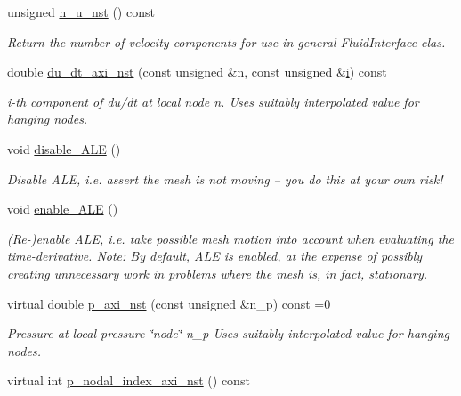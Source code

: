 \begin{DoxyCompactItemize}
unsigned \hyperlink{classoomph_1_1AxisymmetricNavierStokesEquations_aa1749260b72bab92bc64234d9c8c57d8}{n\+\_\+u\+\_\+nst} () const
\begin{DoxyCompactList}\small\item\em Return the number of velocity components for use in general Fluid\+Interface clas. \end{DoxyCompactList}\item 
double \hyperlink{classoomph_1_1AxisymmetricNavierStokesEquations_a80b3415e150243f8fff3f8eb87082b24}{du\+\_\+dt\+\_\+axi\+\_\+nst} (const unsigned \&n, const unsigned \&\hyperlink{cfortran_8h_adb50e893b86b3e55e751a42eab3cba82}{i}) const
\begin{DoxyCompactList}\small\item\em i-\/th component of du/dt at local node n. Uses suitably interpolated value for hanging nodes. \end{DoxyCompactList}\item 
void \hyperlink{classoomph_1_1AxisymmetricNavierStokesEquations_a737e9a0e65aa0e88a63d740ea56717ec}{disable\+\_\+\+A\+LE} ()
\begin{DoxyCompactList}\small\item\em Disable A\+LE, i.\+e. assert the mesh is not moving -- you do this at your own risk! \end{DoxyCompactList}\item 
void \hyperlink{classoomph_1_1AxisymmetricNavierStokesEquations_ac5b7a740769b0e5cb1e95db6dab34800}{enable\+\_\+\+A\+LE} ()
\begin{DoxyCompactList}\small\item\em (Re-\/)enable A\+LE, i.\+e. take possible mesh motion into account when evaluating the time-\/derivative. Note\+: By default, A\+LE is enabled, at the expense of possibly creating unnecessary work in problems where the mesh is, in fact, stationary. \end{DoxyCompactList}\item 
virtual double \hyperlink{classoomph_1_1AxisymmetricNavierStokesEquations_a3aa173227f477a40fb4adba84a337f5b}{p\+\_\+axi\+\_\+nst} (const unsigned \&n\+\_\+p) const =0
\begin{DoxyCompactList}\small\item\em Pressure at local pressure \char`\"{}node\char`\"{} n\+\_\+p Uses suitably interpolated value for hanging nodes. \end{DoxyCompactList}\item 
virtual int \hyperlink{classoomph_1_1AxisymmetricNavierStokesEquations_a47c61dbb8a32fd785c99ab3aa8bc35f9}{p\+\_\+nodal\+\_\+index\+\_\+axi\+\_\+nst} () const

\end{DoxyCompactItemize}
